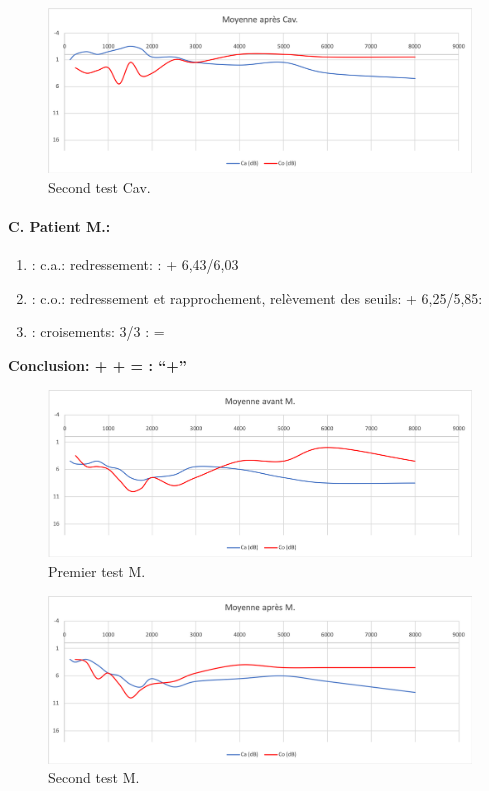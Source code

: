                 \begin{figure}
\centering
\includegraphics[width=0.7\linewidth]{images/graphiques/cav_post.png}
\caption[Moyenne OG+OD]{Second test Cav.}
       
\label{groupecontroleimage1}
                \end{figure}



                
               \paragraph{ C. Patient M.:}


	\begin{enumerate}
 		
 		\item : c.a.: redressement: : +    6,43/6,03
                
 		\item : c.o.: redressement et rapprochement,
                  relèvement des seuils:  +     6,25/5,85:
 		\item : croisements: 3/3 :  =
                  
                \end{enumerate}

                \textbf{  Conclusion:  +  +  =     : ``+''}

                \begin{figure}
\centering
\includegraphics[width=0.7\linewidth]{images/graphiques/m_pre.png}
\caption[Moyenne OG+OD]{Premier test M.}
       
\label{groupecontroleimage1}
\end{figure}


                        \begin{figure}
\centering
\includegraphics[width=0.7\linewidth]{images/graphiques/m_post.png}
\caption[Moyenne OG+OD]{Second test M.}
       
\label{groupecontroleimage1}
\end{figure}



